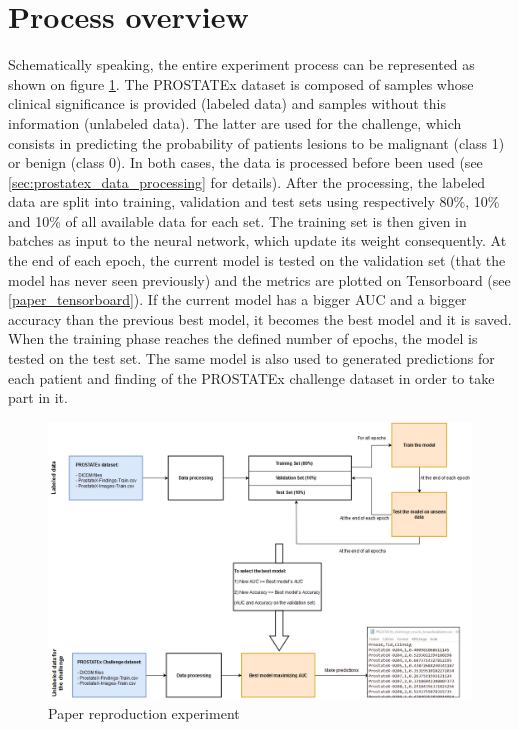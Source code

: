 \section{Process overview}
Schematically speaking, the entire experiment process can be represented as shown on figure \ref{fig:paper_reproduction_process}. The PROSTATEx dataset is composed of samples whose clinical significance is provided (labeled data) and samples without this information (unlabeled data). The latter are used for the challenge, which consists in predicting the probability of patients lesions to be malignant (class 1) or benign (class 0). In both cases, the data is processed before been used (see \ref{sec:prostatex_data_processing} for details). After the processing, the labeled data are split into training, validation and test sets using respectively 80\%, 10\% and 10\% of all available data for each set. The training set is then given in batches as input to the neural network, which update its weight consequently. At the end of each epoch, the current model is tested on the validation set (that the model has never seen previously) and the metrics are plotted on Tensorboard (see \ref{paper_tensorboard}). If the current model has a bigger AUC and a bigger accuracy than the previous best model, it becomes the best model and it is saved. When the training phase reaches the defined number of epochs, the model is tested on the test set. The same model is also used to generated predictions for each patient and finding of the PROSTATEx challenge dataset in order to take part in it. 

\begin{figure}[!h]
\centering
\includegraphics[width=1\textwidth, keepaspectratio=true]{./figures/paper_reproduction_process.png}
\caption{Paper reproduction experiment}
\label{fig:paper_reproduction_process}
\end{figure}


